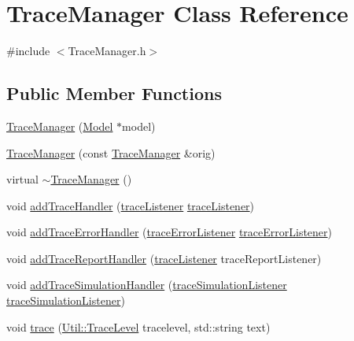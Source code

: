 \hypertarget{class_trace_manager}{}\section{Trace\+Manager Class Reference}
\label{class_trace_manager}


{\ttfamily \#include $<$Trace\+Manager.\+h$>$}

\subsection*{Public Member Functions}
\begin{DoxyCompactItemize}
\item 
\hyperlink{class_trace_manager_ae3cb94c21a56691462d818ae8acd30cf}{Trace\+Manager} (\hyperlink{class_model}{Model} $\ast$model)
\item 
\hyperlink{class_trace_manager_af3564e61b170274e281ff6265c36e31a}{Trace\+Manager} (const \hyperlink{class_trace_manager}{Trace\+Manager} \&orig)
\item 
virtual \hyperlink{class_trace_manager_a0f0988540948118357e571343d8fc48f}{$\sim$\+Trace\+Manager} ()
\item 
void \hyperlink{class_trace_manager_a2eecf24da6bb5a61fb423b3f7479abb1}{add\+Trace\+Handler} (\hyperlink{_trace_manager_8h_a1136585847f84bdff0c8d3e7fef53d50}{trace\+Listener} \hyperlink{_trace_manager_8h_a1136585847f84bdff0c8d3e7fef53d50}{trace\+Listener})
\item 
void \hyperlink{class_trace_manager_a73e155f9b07c9de7d4b1a5d4689fd554}{add\+Trace\+Error\+Handler} (\hyperlink{_trace_manager_8h_acbbf973df10808566f22d73581076abd}{trace\+Error\+Listener} \hyperlink{_trace_manager_8h_acbbf973df10808566f22d73581076abd}{trace\+Error\+Listener})
\item 
void \hyperlink{class_trace_manager_a5c28a84a8b4a00d5aaa465ccdbf7e7b9}{add\+Trace\+Report\+Handler} (\hyperlink{_trace_manager_8h_a1136585847f84bdff0c8d3e7fef53d50}{trace\+Listener} trace\+Report\+Listener)
\item 
void \hyperlink{class_trace_manager_af39ddecdcbb84c6aa62bfefcded7bf69}{add\+Trace\+Simulation\+Handler} (\hyperlink{_trace_manager_8h_a103daf352a5c1b34d88af32d716bce7e}{trace\+Simulation\+Listener} \hyperlink{_trace_manager_8h_a103daf352a5c1b34d88af32d716bce7e}{trace\+Simulation\+Listener})
\item 
void \hyperlink{class_trace_manager_a242d77829b85a436fd2aab2092bfa50c}{trace} (\hyperlink{class_util_a0a3482cfa2d915e261c0cf528fdc7afc}{Util\+::\+Trace\+Level} tracelevel, std\+::string text)

\end{DoxyCompactItemize}

